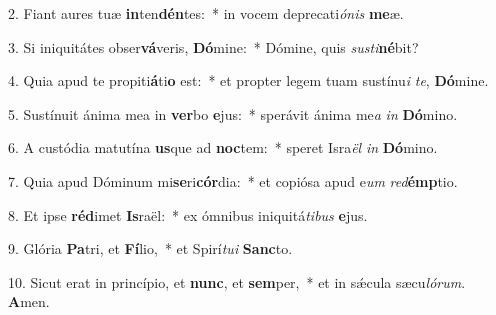 2. Fiant aures tuæ \textbf{in}ten\textbf{dén}tes:~*  in vocem deprecati\textit{ó}\textit{nis} \textbf{me}æ.\

3. Si iniquitátes obser\textbf{vá}veris, \textbf{Dó}mine:~*  Dómine, quis \textit{sus}\textit{ti}\textbf{né}bit?\

4. Quia apud te propiti\textbf{á}ti\textbf{o} est:~*  et propter legem tuam sustínu\textit{i} \textit{te}, \textbf{Dó}mine.\

5. Sustínuit ánima mea in \textbf{ver}bo \textbf{e}jus:~*  sperávit ánima me\textit{a} \textit{in} \textbf{Dó}mino.\

6. A custódia matutína \textbf{us}que ad \textbf{noc}tem:~*  speret Isra\textit{ël} \textit{in} \textbf{Dó}mino.\

7. Quia apud Dóminum mi\textbf{se}ri\textbf{cór}dia:~*  et copiósa apud e\textit{um} \textit{red}\textbf{émp}tio.\

8. Et ipse \textbf{réd}imet \textbf{Is}raël:~*  ex ómnibus iniquitá\textit{ti}\textit{bus} \textbf{e}jus.\

9. Glória \textbf{Pa}tri, et \textbf{Fí}lio,~*  et Spirí\textit{tu}\textit{i} \textbf{Sanc}to.\

10. Sicut erat in princípio, et \textbf{nunc}, et \textbf{sem}per,~*  et in sǽcula sæcu\textit{ló}\textit{rum}. \textbf{A}men.\

